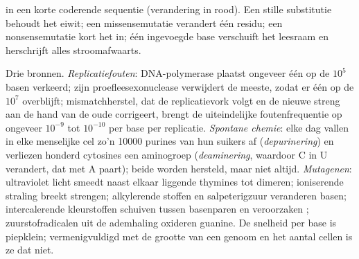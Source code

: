 \begin{omfigure}

{\small {} in een korte coderende sequentie (verandering in
rood). Een stille substitutie behoudt het eiwit; een missensemutatie
verandert één residu; een nonsensemutatie kort het in; één ingevoegde
base verschuift het leesraam en herschrijft alles stroomafwaarts.}
\end{omfigure}

\begin{proposition}\label{prop:b2:genome-diversification:sources}
Drie bronnen. \emph{Replicatiefouten}: DNA-polymerase plaatst ongeveer
één op de $10^{5}$ basen verkeerd; zijn proefleesexonuclease verwijdert
de meeste, zodat er één op de $10^{7}$ overblijft; mismatchherstel, dat
de replicatievork volgt en de nieuwe streng aan de hand van de oude
corrigeert, brengt de uiteindelijke foutenfrequentie op ongeveer
$10^{-9}$ tot $10^{-10}$ per base per replicatie. \emph{Spontane
chemie}: elke dag vallen in elke menselijke cel zo'n \num{10000}
purines van hun suikers af (\emph{depurinering}) en verliezen honderd
cytosines een aminogroep (\emph{deaminering}, waardoor C in U verandert,
dat met A paart); beide worden hersteld, maar niet altijd.
\emph{Mutagenen}: ultraviolet licht smeedt naast elkaar liggende
thymines tot dimeren; ioniserende straling breekt strengen;
alkylerende stoffen en salpeterigzuur veranderen basen;
intercalerende kleurstoffen schuiven tussen basenparen en veroorzaken
; zuurstofradicalen uit de ademhaling oxideren
guanine. De snelheid per base is piepklein; vermenigvuldigd met de
grootte van een genoom en het aantal cellen is ze dat niet.
\end{proposition}

